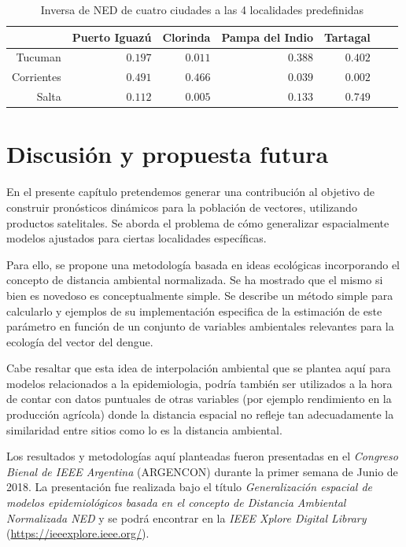     \begin{table}[hbt]
    \centering
    \caption{Inversa de NED de cuatro ciudades a las 4 localidades predefinidas}\label{Tab:comparacion_ned}
    \begin{tabular}{*7{r}}
    \toprule
    & Puerto Iguazú
    & Clorinda
    & Pampa del Indio
    & Tartagal \\ \midrule
    Tucuman
    &$0.197$
    &$0.011$
    &$0.388$%
    &$0.402$\\
    Corrientes
    &$0.491$
    &$0.466$
    &$0.039$
    &$0.002$ \\
    Salta
    &$0.112$
    &$0.005$
    &$0.133$   %
    &$0.749$ \\
    \bottomrule
    \end{tabular}
    \end{table}

\section{Discusión y propuesta futura}
  \par En el presente capítulo pretendemos generar una contribución al objetivo de
    construir pronósticos dinámicos para la población de vectores,
    utilizando productos satelitales. Se aborda el problema de cómo generalizar
    espacialmente modelos ajustados para ciertas localidades específicas.

  \par Para ello, se propone una metodología basada en ideas ecológicas
    incorporando el concepto de distancia ambiental normalizada.
    Se ha mostrado que el mismo si bien es novedoso es conceptualmente simple.
    Se describe un método simple para calcularlo y ejemplos de su
    implementación especifica de la estimación de este parámetro en
    función de un conjunto de variables ambientales relevantes para la
    ecología del vector del dengue.

  \par Cabe resaltar que esta idea de interpolación ambiental que se
    plantea aquí para modelos relacionados a la epidemiologia,
    podría también ser utilizados a la hora de contar con datos
    puntuales de otras variables (por ejemplo rendimiento en la producción
    agrícola) donde la distancia espacial no refleje tan adecuadamente la
    similaridad entre sitios como lo es la distancia ambiental.


  \par Los resultados y metodologías aquí planteadas fueron presentadas en el
    \textit{Congreso Bienal de IEEE Argentina} (ARGENCON) durante la primer semana de Junio
    de 2018. La presentación fue realizada bajo el título
    \textit{Generalización espacial de modelos epidemiológicos basada en el
    concepto de Distancia Ambiental Normalizada NED} \cite{ned_scavuzzo} y
    se podrá encontrar en la \textit{IEEE Xplore Digital Library} (\url{https://ieeexplore.ieee.org/}).
%
